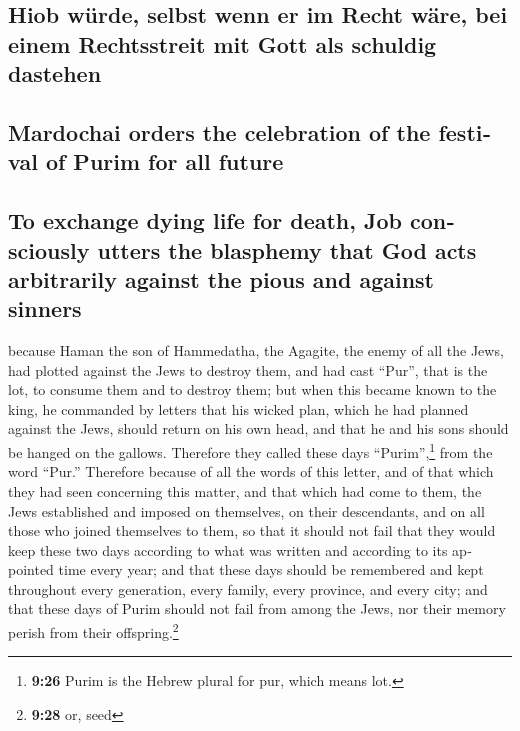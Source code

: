 \begin{paracol}{2}
\begin{otherlanguage}{english}
\hypertarget{hiob-wuxfcrde-selbst-wenn-er-im-recht-wuxe4re-bei-einem-rechtsstreit-mit-gott-als-schuldig-dastehen}{%
\subsection{Hiob würde, selbst wenn er im Recht wäre, bei einem
Rechtsstreit mit Gott als schuldig
dastehen}\label{hiob-wuxfcrde-selbst-wenn-er-im-recht-wuxe4re-bei-einem-rechtsstreit-mit-gott-als-schuldig-dastehen}}

\hypertarget{mardochai-orders-the-celebration-of-the-festival-of-purim-for-all-future}{%
\subsection{Mardochai orders the celebration of the festival of Purim
for all
future}\label{mardochai-orders-the-celebration-of-the-festival-of-purim-for-all-future}}

\hypertarget{to-exchange-dying-life-for-death-job-consciously-utters-the-blasphemy-that-god-acts-arbitrarily-against-the-pious-and-against-sinners}{%
\subsection{To exchange dying life for death, Job consciously utters the
blasphemy that God acts arbitrarily against the pious and against
sinners}\label{to-exchange-dying-life-for-death-job-consciously-utters-the-blasphemy-that-god-acts-arbitrarily-against-the-pious-and-against-sinners}}

 because Haman the son of Hammedatha, the Agagite, the
enemy of all the Jews, had plotted against the Jews to destroy them, and
had cast ``Pur'', that is the lot, to consume them and to destroy them;
 but when this became known to the king, he commanded by
letters that his wicked plan, which he had planned against the Jews,
should return on his own head, and that he and his sons should be hanged
on the gallows.  Therefore they called these days
``Purim'',\footnote{\textbf{9:26} Purim is the Hebrew plural for pur,
  which means lot.} from the word ``Pur.'' Therefore because of all the
words of this letter, and of that which they had seen concerning this
matter, and that which had come to them,  the Jews
established and imposed on themselves, on their descendants, and on all
those who joined themselves to them, so that it should not fail that
they would keep these two days according to what was written and
according to its appointed time every year;  and that
these days should be remembered and kept throughout every generation,
every family, every province, and every city; and that these days of
Purim should not fail from among the Jews, nor their memory perish from
their offspring.\footnote{\textbf{9:28} or, seed}


\end{otherlanguage}
\end{paracol}
